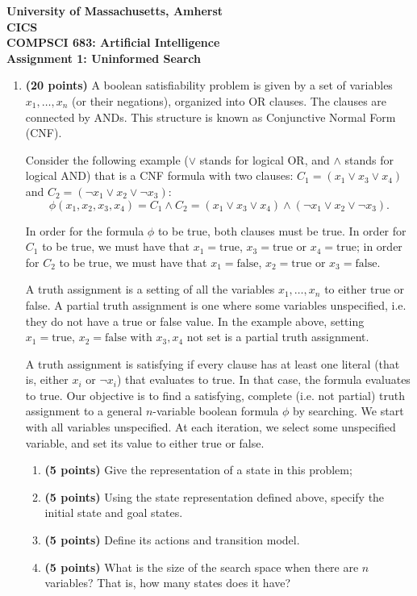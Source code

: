 \documentclass[11pt]{article}
\begin{document}
\begin{center}
    {\Large \textbf{University of Massachusetts, Amherst}}\\[0.4em]
    {\large \textbf{CICS}}\\[0.8em]
    {\Large \textbf{COMPSCI 683: Artificial Intelligence}}\\[0.4em]
    {\large \textbf{Assignment 1: Uninformed Search}}
\end{center}

\begin{enumerate}[leftmargin=*, label=\textbf{\arabic*.}]

\item \textbf{(20 points)} A boolean satisfiability problem is given by a set of variables $x_1,\ldots,x_n$ (or their negations), organized into OR clauses. The clauses are connected by ANDs. This structure is known as Conjunctive Normal Form (CNF).

Consider the following example ($\vee$ stands for logical OR, and $\wedge$ stands for logical AND) that is a CNF formula with two clauses: $C_1=(x_1\vee x_3\vee x_4)$ and $C_2=(\neg x_1\vee x_2\vee \neg x_3)$:
\[
\phi(x_1,x_2,x_3,x_4)=C_1\wedge C_2=(x_1\vee x_3\vee x_4)\wedge(\neg x_1\vee x_2\vee \neg x_3).
\]

In order for the formula $\phi$ to be true, both clauses must be true. In order for $C_1$ to be true, we must have that $x_1=\text{true}$, $x_3=\text{true}$ or $x_4=\text{true}$; in order for $C_2$ to be true, we must have that $x_1=\text{false}$, $x_2=\text{true}$ or $x_3=\text{false}$.

A truth assignment is a setting of all the variables $x_1,\ldots,x_n$ to either true or false. A partial truth assignment is one where some variables unspecified, i.e. they do not have a true or false value. In the example above, setting $x_1=\text{true}$, $x_2=\text{false}$ with $x_3,x_4$ not set is a partial truth assignment.

A truth assignment is satisfying if every clause has at least one literal (that is, either $x_i$ or $\neg x_i$) that evaluates to true. In that case, the formula evaluates to true. Our objective is to find a satisfying, complete (i.e. not partial) truth assignment to a general $n$-variable boolean formula $\phi$ by searching. We start with all variables unspecified. At each iteration, we select some unspecified variable, and set its value to either true or false.

\begin{enumerate}[label=(\alph*), leftmargin=2em]
    \item \textbf{(5 points)} Give the representation of a state in this problem;
    \item \textbf{(5 points)} Using the state representation defined above, specify the initial state and goal states.
    \item \textbf{(5 points)} Define its actions and transition model.
    \item \textbf{(5 points)} What is the size of the search space when there are $n$ variables? That is, how many states does it have?
\end{enumerate}


\end{enumerate}
\end{document}
